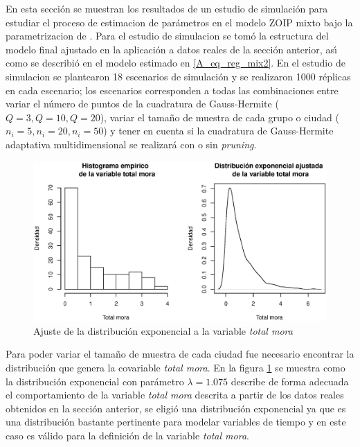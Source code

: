 En esta secci\'{o}n se muestran los resultados de un estudio de simulaci\'{o}n para estudiar el proceso de estimacion de par\'{a}metros en el modelo ZOIP mixto bajo la parametrizacion de \cite{Stasinopoulos2}. Para el estudio de simulacion se tom\'{o} la estructura del modelo final ajustado en la aplicaci\'{o}n a datos reales de la secci\'{o}n anterior, as\'{\i} como se des\-cri\-bi\'{o} en el modelo estimado en \eqref{A_eq_reg_mix2}. En el estudio de simulacion se plantearon 18 escenarios de simulaci\'{o}n y se realizaron 1000 r\'{e}plicas en cada escenario; los escenarios corresponden a todas las combinaciones entre variar el n\'{u}mero de puntos de la cuadratura de Gauss-Hermite ($Q=3 , Q=10, Q=20$), variar el tama\~{n}o de muestra de cada grupo o ciudad ($n_i=5, n_i=20, n_i=50$) y tener en cuenta si la cuadratura de Gauss-Hermite adaptativa multidimensional se realizar\'{a} con o sin \textit{pruning}.\\

\begin{figure}
	\begin{center}
		\includegraphics[scale=0.6]{Ajuste_expo_mix.eps}	
		\caption{Ajuste de la distribuci\'{o}n exponencial a la variable \textsl{total mora}}
		\label{Ajuste_expo_mix}
	\end{center}
\end{figure}

Para poder variar el tama\~{n}o de muestra de cada ciudad fue necesario encontrar la distribuci\'{o}n que genera la covariable \textsl{total mora}. En la figura \ref{Ajuste_expo_mix} se muestra como la distribuci\'{o}n exponencial con par\'{a}metro $\lambda=1.075$ describe de forma adecuada el comportamiento de la variable \textsl{total mora} descrita a partir de los datos reales obtenidos en la secci\'{o}n anterior, se eligi\'{o} una distribuci\'{o}n exponencial ya que es una distribuci\'{o}n bastante pertinente para modelar variables de tiempo y en este caso es v\'{a}lido para la definici\'{o}n de la variable \textsl{total mora}.\\

